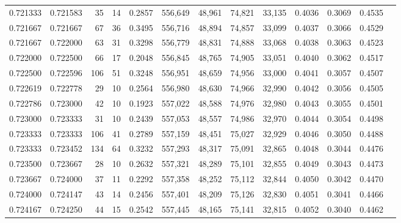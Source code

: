 \begin{tabular}{rrrrrrrrrrrrr}
0.721333 & 0.721583 &    35 &  14 &                                     0.2857 & 556,649 &  48,961 &  74,821 &  33,135 & 0.4036 & 0.3069 & 0.4535 \\
0.721667 & 0.721667 &    67 &  36 &                                     0.3495 & 556,716 &  48,894 &  74,857 &  33,099 & 0.4037 & 0.3066 & 0.4529 \\
0.721667 & 0.722000 &    63 &  31 &                                     0.3298 & 556,779 &  48,831 &  74,888 &  33,068 & 0.4038 & 0.3063 & 0.4523 \\
0.722000 & 0.722500 &    66 &  17 &                                     0.2048 & 556,845 &  48,765 &  74,905 &  33,051 & 0.4040 & 0.3062 & 0.4517 \\
0.722500 & 0.722596 &   106 &  51 &                                     0.3248 & 556,951 &  48,659 &  74,956 &  33,000 & 0.4041 & 0.3057 & 0.4507 \\
0.722619 & 0.722778 &    29 &  10 &                                     0.2564 & 556,980 &  48,630 &  74,966 &  32,990 & 0.4042 & 0.3056 & 0.4505 \\
0.722786 & 0.723000 &    42 &  10 &                                     0.1923 & 557,022 &  48,588 &  74,976 &  32,980 & 0.4043 & 0.3055 & 0.4501 \\
0.723000 & 0.723333 &    31 &  10 &                                     0.2439 & 557,053 &  48,557 &  74,986 &  32,970 & 0.4044 & 0.3054 & 0.4498 \\
0.723333 & 0.723333 &   106 &  41 &                                     0.2789 & 557,159 &  48,451 &  75,027 &  32,929 & 0.4046 & 0.3050 & 0.4488 \\
0.723333 & 0.723452 &   134 &  64 &                                     0.3232 & 557,293 &  48,317 &  75,091 &  32,865 & 0.4048 & 0.3044 & 0.4476 \\
0.723500 & 0.723667 &    28 &  10 &                                     0.2632 & 557,321 &  48,289 &  75,101 &  32,855 & 0.4049 & 0.3043 & 0.4473 \\
0.723667 & 0.724000 &    37 &  11 &                                     0.2292 & 557,358 &  48,252 &  75,112 &  32,844 & 0.4050 & 0.3042 & 0.4470 \\
0.724000 & 0.724147 &    43 &  14 &                                     0.2456 & 557,401 &  48,209 &  75,126 &  32,830 & 0.4051 & 0.3041 & 0.4466 \\
0.724167 & 0.724250 &    44 &  15 &                                     0.2542 & 557,445 &  48,165 &  75,141 &  32,815 & 0.4052 & 0.3040 & 0.4462 \\

\end{tabular}
